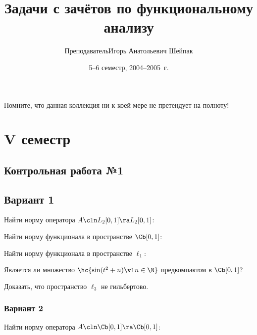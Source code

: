 \documentclass[a4paper]{article}
\title{Задачи с зачётов по функциональному анализу}
\author{Преподаватель\т Игорь Анатольевич Шейпак}
\date{5--6 семестр, 2004--2005~г.}
\begin{document}
\maketitle

\centerline{\footnotesize Помните, что данная коллекция ни к коей мере не претендует на полноту!}

\section{V семестр}

\subsection{Контрольная работа №1}

\subsection{Вариант 1}
\setcounter{problem}{0}
\begin{problem}
Найти норму оператора $A\cln  L_2[0,1] \ra L_2[0,1]$:
\end{problem}

\begin{problem}
Найти норму функционала в пространстве $\Cb[0,1]$:
\end{problem}

\begin{problem}
Найти норму функционала в пространстве $\ell_1$:
\end{problem}

\begin{problem}
Является ли множество $\hc{\sin(t^2+n) \vl n \in \N}$ предкомпактом в $\Cb[0,1]$?
\end{problem}

\begin{problem}
Доказать, что пространство $\ell_3$ не гильбертово.
\end{problem}

\subsubsection{Вариант 2}

\setcounter{problem}{0}
\begin{problem}
Найти норму оператора $A\cln \Cb[0,1]\ra \Cb[0,1]$:
\end{problem}
\end{document}
